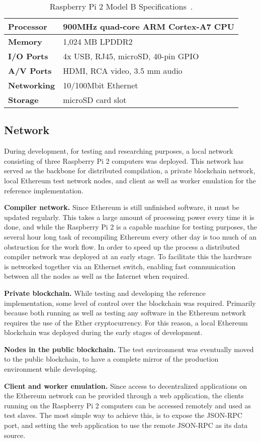 \begin{table}[h]
\centering
\caption{Raspberry Pi 2 Model B Specifications~\cite{rpi}.}
\label{rpi}
\begin{tabular}{|l|l|}
\hline \textbf{Processor} & 900MHz quad-core ARM Cortex-A7 CPU \\ \hline
\textbf{Memory} & 1,024 MB LPDDR2 \\ \hline 
\textbf{I/O Ports} & 4x USB, RJ45, microSD, 40-pin GPIO \\ \hline
\textbf{A/V Ports} & HDMI, RCA video, 3.5 mm audio \\ \hline
\textbf{Networking} & 10/100Mbit Ethernet \\ \hline
\textbf{Storage} & microSD card slot \\ \hline
\end{tabular}
\end{table}

\subsection{Network}
During development, for testing and researching purposes, a local network consisting of three Raspberry Pi 2 computers was deployed. This network has served as the backbone for distributed compilation, a private blockchain network, local Ethereum test network nodes, and client as well as worker emulation for the reference implementation.

\textbf{Compiler network.} Since Ethereum is still unfinished software, it must be updated regularly. This takes a large amount of processing power every time it is done, and while the Raspberry Pi 2 is a capable machine for testing purposes, the several hour long task of recompiling Ethereum every other day is too much of an obstruction for the work flow. In order to speed up the process a distributed compiler network was deployed at an early stage. To facilitate this the hardware is networked together via an Ethernet switch, enabling fast communication between all the nodes as well as the Internet when required. 

\textbf{Private blockchain.} While testing and developing the reference implementation, some level of control over the blockchain was required. Primarily because both running as well as testing any software in the Ethereum network requires the use of the Ether cryptocurrency. For this reason, a local Ethereum blockchain was deployed during the early stages of development.

\textbf{Nodes in the public blockchain.} The test environment was eventually moved to the public blockchain, to have a complete mirror of the production environment while developing.

\textbf{Client and worker emulation.} Since access to decentralized applications on the Ethereum network can be provided through a web application, the clients running on the Raspberry Pi 2 computers can be accessed remotely and used as test slaves. The most simple way to achieve this, is to expose the JSON-RPC port, and setting the web application to use the remote JSON-RPC as its data source.

